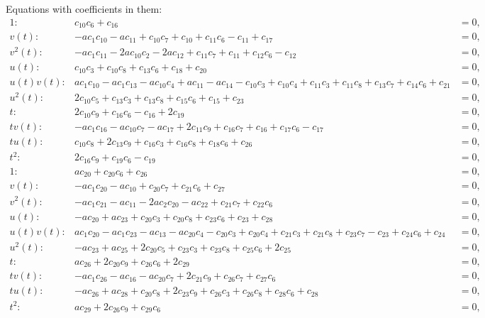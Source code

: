 \documentclass{article}
\begin{document}
Equations with coefficients in them:
\begin{align*}
1:&c_{10} c_{6} + c_{16}&=0,\\
v{\left(t \right)}:&- a c_{1} c_{10} - a c_{11} + c_{10} c_{7} + c_{10} + c_{11} c_{6} - c_{11} + c_{17}&=0,\\
v^{2}{\left(t \right)}:&- a c_{1} c_{11} - 2 a c_{10} c_{2} - 2 a c_{12} + c_{11} c_{7} + c_{11} + c_{12} c_{6} - c_{12}&=0,\\
u{\left(t \right)}:&c_{10} c_{3} + c_{10} c_{8} + c_{13} c_{6} + c_{18} + c_{20}&=0,\\
u{\left(t \right)} v{\left(t \right)}:&a c_{1} c_{10} - a c_{1} c_{13} - a c_{10} c_{4} + a c_{11} - a c_{14} - c_{10} c_{3} + c_{10} c_{4} + c_{11} c_{3} + c_{11} c_{8} + c_{13} c_{7} + c_{14} c_{6} + c_{21}&=0,\\
u^{2}{\left(t \right)}:&2 c_{10} c_{5} + c_{13} c_{3} + c_{13} c_{8} + c_{15} c_{6} + c_{15} + c_{23}&=0,\\
t:&2 c_{10} c_{9} + c_{16} c_{6} - c_{16} + 2 c_{19}&=0,\\
t v{\left(t \right)}:&- a c_{1} c_{16} - a c_{10} c_{7} - a c_{17} + 2 c_{11} c_{9} + c_{16} c_{7} + c_{16} + c_{17} c_{6} - c_{17}&=0,\\
t u{\left(t \right)}:&c_{10} c_{8} + 2 c_{13} c_{9} + c_{16} c_{3} + c_{16} c_{8} + c_{18} c_{6} + c_{26}&=0,\\
t^{2}:&2 c_{16} c_{9} + c_{19} c_{6} - c_{19}&=0,\\
1:&a c_{20} + c_{20} c_{6} + c_{26}&=0,\\
v{\left(t \right)}:&- a c_{1} c_{20} - a c_{10} + c_{20} c_{7} + c_{21} c_{6} + c_{27}&=0,\\
v^{2}{\left(t \right)}:&- a c_{1} c_{21} - a c_{11} - 2 a c_{2} c_{20} - a c_{22} + c_{21} c_{7} + c_{22} c_{6}&=0,\\
u{\left(t \right)}:&- a c_{20} + a c_{23} + c_{20} c_{3} + c_{20} c_{8} + c_{23} c_{6} + c_{23} + c_{28}&=0,\\
u{\left(t \right)} v{\left(t \right)}:&a c_{1} c_{20} - a c_{1} c_{23} - a c_{13} - a c_{20} c_{4} - c_{20} c_{3} + c_{20} c_{4} + c_{21} c_{3} + c_{21} c_{8} + c_{23} c_{7} - c_{23} + c_{24} c_{6} + c_{24}&=0,\\
u^{2}{\left(t \right)}:&- a c_{23} + a c_{25} + 2 c_{20} c_{5} + c_{23} c_{3} + c_{23} c_{8} + c_{25} c_{6} + 2 c_{25}&=0,\\
t:&a c_{26} + 2 c_{20} c_{9} + c_{26} c_{6} + 2 c_{29}&=0,\\
t v{\left(t \right)}:&- a c_{1} c_{26} - a c_{16} - a c_{20} c_{7} + 2 c_{21} c_{9} + c_{26} c_{7} + c_{27} c_{6}&=0,\\
t u{\left(t \right)}:&- a c_{26} + a c_{28} + c_{20} c_{8} + 2 c_{23} c_{9} + c_{26} c_{3} + c_{26} c_{8} + c_{28} c_{6} + c_{28}&=0,\\
t^{2}:&a c_{29} + 2 c_{26} c_{9} + c_{29} c_{6}&=0,\\
\end{align*}
\end{document}
